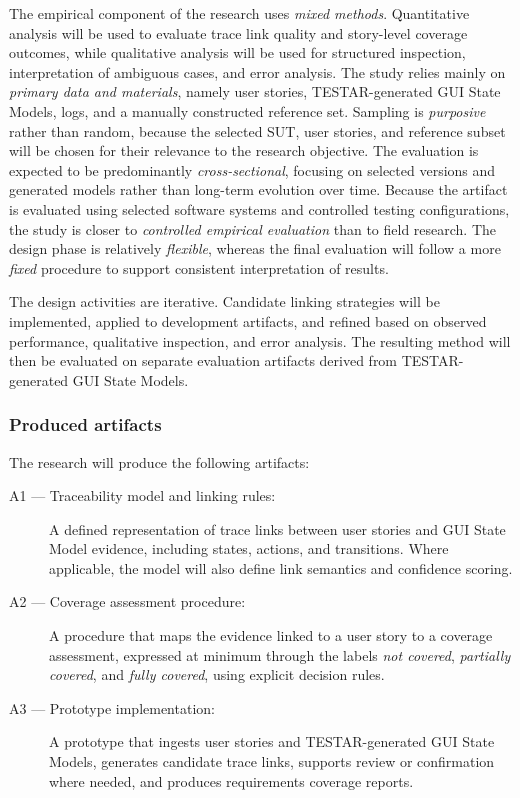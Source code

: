 The empirical component of the research uses \emph{mixed methods}. Quantitative analysis will be used to evaluate trace link quality and story-level coverage outcomes, while qualitative analysis will be used for structured inspection, interpretation of ambiguous cases, and error analysis. The study relies mainly on \emph{primary data and materials}, namely user stories, TESTAR-generated GUI State Models, logs, and a manually constructed reference set. Sampling is \emph{purposive} rather than random, because the selected SUT, user stories, and reference subset will be chosen for their relevance to the research objective. The evaluation is expected to be predominantly \emph{cross-sectional}, focusing on selected versions and generated models rather than long-term evolution over time. Because the artifact is evaluated using selected software systems and controlled testing configurations, the study is closer to \emph{controlled empirical evaluation} than to field research. The design phase is relatively \emph{flexible}, whereas the final evaluation will follow a more \emph{fixed} procedure to support consistent interpretation of results.

The design activities are iterative. Candidate linking strategies will be implemented, applied to development artifacts, and refined based on observed performance, qualitative inspection, and error analysis. The resulting method will then be evaluated on separate evaluation artifacts derived from TESTAR-generated GUI State Models.



\subsubsection{Produced artifacts}
\label{subsubsec:produced-artifacts}

The research will produce the following artifacts:

\begin{description}
    \item[A1 --- Traceability model and linking rules:]
    A defined representation of trace links between user stories and GUI State Model evidence, including states, actions, and transitions. Where applicable, the model will also define link semantics and confidence scoring.

    \item[A2 --- Coverage assessment procedure:]
    A procedure that maps the evidence linked to a user story to a coverage assessment, expressed at minimum through the labels \emph{not covered}, \emph{partially covered}, and \emph{fully covered}, using explicit decision rules.

    \item[A3 --- Prototype implementation:]
    A prototype that ingests user stories and TESTAR-generated GUI State Models, generates candidate trace links, supports review or confirmation where needed, and produces requirements coverage reports.
\end{description}

